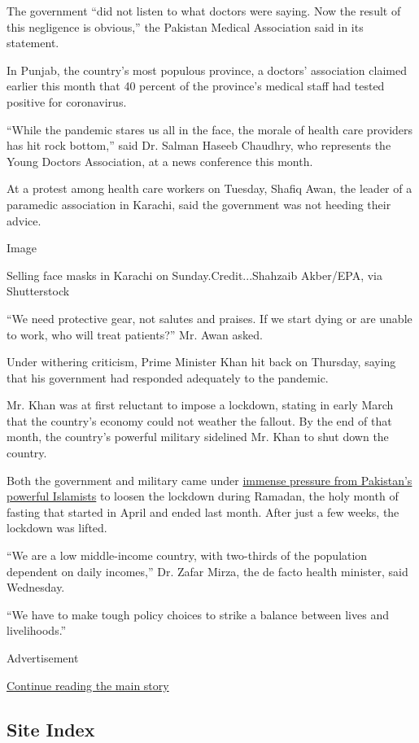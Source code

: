 The government ``did not listen to what doctors were saying. Now the
result of this negligence is obvious,'' the Pakistan Medical Association
said in its statement.

In Punjab, the country's most populous province, a doctors' association
claimed earlier this month that 40 percent of the province's medical
staff had tested positive for coronavirus.

``While the pandemic stares us all in the face, the morale of health
care providers has hit rock bottom,'' said Dr. Salman Haseeb Chaudhry,
who represents the Young Doctors Association, at a news conference this
month.

At a protest among health care workers on Tuesday, Shafiq Awan, the
leader of a paramedic association in Karachi, said the government was
not heeding their advice.

Image

Selling face masks in Karachi on Sunday.Credit...Shahzaib Akber/EPA, via
Shutterstock

``We need protective gear, not salutes and praises. If we start dying or
are unable to work, who will treat patients?'' Mr. Awan asked.

Under withering criticism, Prime Minister Khan hit back on Thursday,
saying that his government had responded adequately to the pandemic.

Mr. Khan was at first reluctant to impose a lockdown, stating in early
March that the country's economy could not weather the fallout. By the
end of that month, the country's powerful military sidelined Mr. Khan to
shut down the country.

Both the government and military came under
\href{https://www.nytimes.com/2020/04/23/world/asia/pakistan-coronavirus-ramadan.html}{immense
pressure from Pakistan's powerful Islamists} to loosen the lockdown
during Ramadan, the holy month of fasting that started in April and
ended last month. After just a few weeks, the lockdown was lifted.

``We are a low middle-income country, with two-thirds of the population
dependent on daily incomes,'' Dr. Zafar Mirza, the de facto health
minister, said Wednesday.

``We have to make tough policy choices to strike a balance between lives
and livelihoods.''

Advertisement

\protect\hyperlink{after-bottom}{Continue reading the main story}

\hypertarget{site-index}{%
\subsection{Site Index}\label{site-index}}

